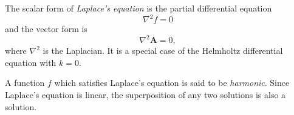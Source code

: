 \documentclass[12pt]{article}
\newcommand{\vA}{\mathbf{A}}
\newcommand{\vnabla}{\nabla}
\begin{document}
The scalar form of \emph{Laplace's equation} is the partial differential equation $$\vnabla^2f = 0$$ and the vector form is $$\vnabla^2\vA = 0,$$where $\vnabla^2$ is the Laplacian. It is a special case of the Helmholtz differential equation with $k = 0.$

A function $f$ which satisfies Laplace's equation is said to be \emph{harmonic}. Since Laplace's equation is linear, the superposition of any two solutions is also a solution.
\end{document}
